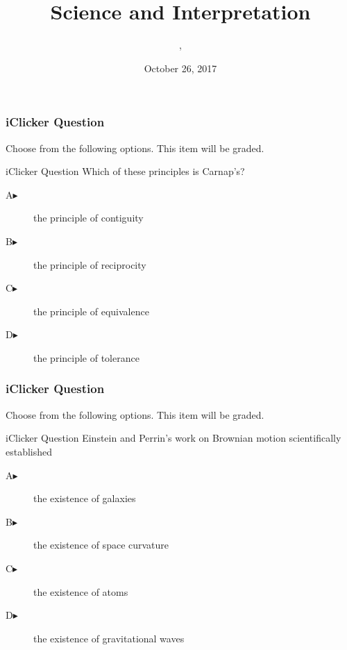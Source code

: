 \documentclass[xcolor=dvipsnames]{beamer}
\title{Science and Interpretation}
\subtitle{{\CourseNumber}, {\CourseInst}}
\author{\CourseName}
\date{October 26, 2017}
\begin{document}
\begin{frame}
  \titlepage
\end{frame}

\begin{frame}
  \frametitle{iClicker Question}
Choose from the following options. This item will be graded.
\begin{block}{iClicker Question}
Which of these principles is Carnap's?
\end{block}
\begin{description}
\item[A\hspace{.2in}$\blacktriangleright$] the principle of contiguity
\item[B\hspace{.2in}$\blacktriangleright$] the principle of reciprocity
\item[C\hspace{.2in}$\blacktriangleright$] the principle of equivalence
\item[D\hspace{.2in}$\blacktriangleright$] the principle of tolerance
\end{description}
\end{frame}

\begin{frame}
  \frametitle{iClicker Question}
Choose from the following options. This item will be graded.
\begin{block}{iClicker Question}
Einstein and Perrin's work on Brownian motion scientifically
established 
\end{block}
\begin{description}
\item[A\hspace{.2in}$\blacktriangleright$] the existence of galaxies
\item[B\hspace{.2in}$\blacktriangleright$] the existence of space curvature
\item[C\hspace{.2in}$\blacktriangleright$] the existence of atoms
\item[D\hspace{.2in}$\blacktriangleright$] the existence of gravitational waves
\end{description}
\end{frame}
\end{document}
